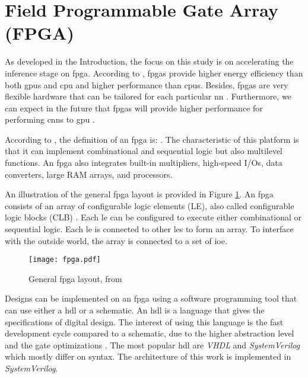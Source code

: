 \section{Field Programmable Gate Array (FPGA)} \label{sec:fpga}
%
%
As developed in the Introduction, the focus on this study is on accelerating the inference stage on \acrshort{fpga}. According to \textcite{mittal_survey_2015}, \acrshort{fpga}s provide higher energy efficiency than both \acrshort{gpu}s and \acrshort{cpu} and higher performance than \acrshort{cpu}s. Besides, \acrshort{fpga}s are very flexible hardware that can be tailored for each particular \acrshort{nn} \cite{vestias_fast_2019}. Furthermore, we can expect in the future that \acrshort{fpga}s will provide higher performance for performing \acrshort{cnn}s to \acrshort{gpu} \cite{nurvitadhi_can_2017}.

According to \textcite{harris_digital_2015}, the definition of an \acrshort{fpga} is: . The characteristic of this platform is that it can implement combinational and sequential logic but also multilevel functions. An \acrshort{fpga} also integrates built-in multipliers, high-speed I/Os, data converters, large RAM arrays, and processors.

An illustration of the general \acrshort{fpga} layout is provided in Figure \ref{fig:fpga}. An \acrshort{fpga} consists of an array of configurable logic elements (LE), also called configurable logic blocks (CLB) \cite{harris_digital_2015}. Each \acrshort{le} can be configured to execute either combinational or sequential logic. Each \acrshort{le} is connected to other \acrshort{le}s to form an array. To interface with the outside world, the array is connected to a set of \acrfull{ioe}.
%
\begin{figure}[H]
    \centering
    \texttt{[image: fpga.pdf]}
    \caption{General \acrshort{fpga} layout, from \cite{harris_digital_2015}}
    \label{fig:fpga}
\end{figure}

Designs can be implemented on an \acrshort{fpga} using a software programming tool that can use either a \acrfull{hdl} or a schematic. An \acrshort{hdl} is a language that gives the specifications of digital design. The interest of using this language is the fast development cycle compared to a schematic, due to the higher abstraction level and the gate optimizations \cite{harris_digital_2015}. The most popular \acrshort{hdl} are \textit{VHDL} and \textit{SystemVerilog} which mostly differ on syntax. The architecture of this work is implemented in \textit{SystemVerilog}. 

